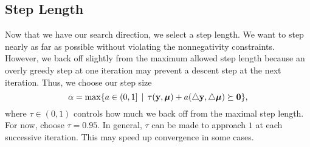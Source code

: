 \begin{comment}
Next, we calculate a maximal allowed step length in the Newton direction:
\[
\hat{\alpha} = \max \{\alpha \in (0,1] \, | \, (y,\lambda) + \alpha(\triangle y, \triangle \lambda) \geq 0\}.
\]
You can check that this value is given by the minimum of the values
\begin{align*}
\min\left(1, \min_{i : \triangle y_i < 0} - \frac{y_i}{\triangle y_i}\right),\\
\min\left(1, \min_{i : \triangle \lambda_i < 0} -\frac{\lambda_i}{\triangle \lambda_i}\right).
\end{align*}

Continuing on, we compute the Newton duality measure given by
\[
\hat{\nu} = \frac{1}{m}(y + \hat{\alpha}\triangle y)\trp (\lambda + \hat{\alpha}\triangle \lambda),
\]
and then the centering parameter
\[
\sigma = \left(\frac{\hat{\nu}}{\nu}\right)^3.
\]

Finally, we obtain our search direction $(\triangle x', \triangle y', \triangle \lambda')$ by solving the perturbed
system
\begin{equation}
\begin{bmatrix}
Q & 0 & -A\trp \\
A & -I & 0\\
0 & \Lambda & \mathcal{Y}
\end{bmatrix}
\begin{bmatrix}
\triangle x'\\
\triangle y'\\
\triangle \lambda'
\end{bmatrix}
=
\begin{bmatrix}
-Qx + A\trp \lambda - c\\
-Ax + y + b\\
-\Lambda\mathcal{Y}e - \triangle \Lambda\triangle\mathcal{Y}e + \sigma\nu e
\end{bmatrix}.
\label{eq:perturbed}
\end{equation}
\end{comment} %

\subsection*{Step Length}
Now that we have our search direction, we select a step length.
 We want to step nearly as far as possible
without violating the nonnegativity constraints. 
However, we back off slightly from the maximum allowed step length
because an overly greedy step at one iteration may prevent a descent step at the next iteration. 
Thus, we choose our step size
\[
\alpha = \max\{a \in (0,1] \, \mid \, \tau(\mathbf{y},\boldsymbol{\mu}) +a(\triangle \mathbf{y}, \triangle \boldsymbol{\mu}) \succeq \mathbf{0}\},
\]
where $\tau \in (0,1)$ controls how much we back off from the maximal step length. 
For now, choose $\tau = 0.95$.
In general, $\tau$ can be made to approach $1$ at each successive iteration.
This may speed up convergence in some cases.

